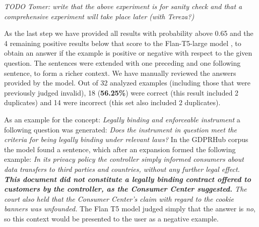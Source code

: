 \textit{TODO Tomer: write that the above experiment is for sanity check and that a comprehensive experiment will take place later (with Tereza?)}

As the last step we have provided all results with probability above 0.65 and the 4 remaining positive results below that score
to the Flan-T5-large model \cite{wei2021finetuned,raffel2020exploring}, to obtain an answer if the example is positive or negative
with respect to the given question. The sentences were extended with one preceding and one following sentence, to form a richer context.
We have manually reviewed the answers provided by the model. Out of 32 analyzed examples (including those  
that were previously judged invalid), 18 (\textbf{56.25\%}) were correct (this result included 2 duplicates) and 14 were incorrect (this set
also included 2 duplicates). 

As an example for the concept: \textit{Legally binding and enforceable
instrument} a following question was generated: \textit{Does the instrument in
question meet the criteria for being legally binding under relevant laws?}
In the GDPRHub corpus the model found a sentence, which after an expansion formed
the following example: \textit{In its privacy policy the controller simply
informed consumers about data transfers to third parties and countries, without
any further legal effect.  \textbf{This document did not constitute a legally binding
contract offered to customers by the controller, as the Consumer Center
suggested.} The court also held that the Consumer Center's claim with regard to
the cookie banners was unfounded.} The Flan T5 model judged simply that the
answer is \textit{no}, so this context would be presented to the user as a
negative example.
